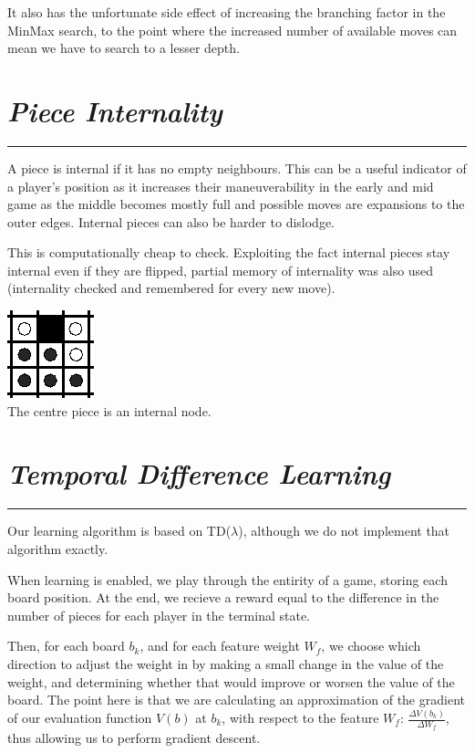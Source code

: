 \documentclass[10pt]{report}
\begin{document}
\begin{multicols}{2}
It also has the unfortunate side effect of increasing the branching factor in the MinMax search, to the point where the increased number of available moves can mean we have to search to a lesser depth.

\section*{\emph{\textmd{Piece Internality}}}
\hrule

A piece is internal if it has no empty neighbours. This can be a useful indicator of a player's position as it increases their maneuverability in the early and mid game as the middle becomes mostly full and possible moves are expansions to the outer edges. Internal pieces can also be harder to dislodge.

This is computationally cheap to check. Exploiting the fact internal pieces stay internal even if they are flipped, partial memory of internality was also used (internality checked and remembered for every new move).

\begin{center}
\includegraphics[scale=0.50]{internality.PNG}\\
The centre piece is an internal node.
\end{center}

\section*{\emph{Temporal Difference Learning}}
\hrule

Our learning algorithm is based on TD($\lambda$), although we do not implement that algorithm exactly.

When learning is enabled, we play through the entirity of a game, storing each board position. At the end, we recieve a reward equal to the difference in the number of pieces for each player in the terminal state.

Then, for each board $b_k$, and for each feature weight $W_f$, we choose which direction to adjust the weight in by making a small change in the value of the weight, and determining whether that would improve or worsen the value of the board. The point here is that we are calculating an approximation of the gradient of our evaluation function $V(b)$ at $b_k$, with respect to the feature $W_f$: $\frac{\Delta V(b_k)}{\Delta W_f}$, thus allowing us to perform gradient descent.


\end{multicols}
\end{document}
